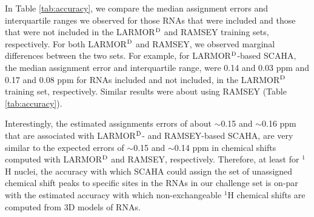 \documentclass[journal=jcisd8,manuscript=article,layout=onecolumn]{achemso}
\begin{document}
In Table \ref{tab:accuracy}, we compare the median assignment errors and interquartile ranges we observed for those RNAs that were included and those that were not included in the LARMOR$^{\rm D}$ and RAMSEY training sets, respectively. For both LARMOR$^{\rm D}$ and RAMSEY, we observed marginal differences between the two sets. For example, for LARMOR$^{\rm D}$-based SCAHA,  the median assignment error and interquartile range, were 0.14 and 0.03 ppm and 0.17 and 0.08 ppm for RNAs included and not included, in the LARMOR$^{\rm D}$ training set, respectively. Similar results were about using RAMSEY (Table \ref{tab:accuracy}). 

Interestingly, the estimated assignments errors of about $\sim$0.15 and $\sim$0.16 ppm that are associated with LARMOR$^{\rm D}$- and RAMSEY-based SCAHA, are very similar to the expected errors of $\sim$0.15\cite{frank2014simple} and $\sim$0.14 ppm\cite{frank2013prediction} in chemical shifts computed with LARMOR$^{\rm D}$ and RAMSEY, respectively. Therefore, at least for $^{1}$H nuclei, the accuracy with which SCAHA could assign the set of unassigned chemical shift peaks  to specific sites in the RNAs in our challenge set is on-par with the estimated accuracy with which non-exchangeable $^{1}$H chemical shifts are computed from 3D models of RNAs.
\end{document}
